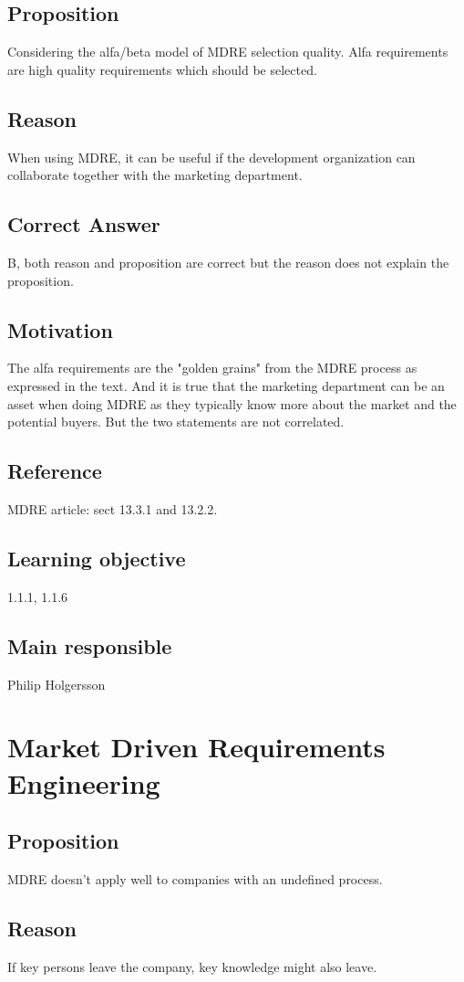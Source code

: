 \documentclass[a4paper]{article}
\begin{document}
\subsection*{Proposition}
Considering the alfa/beta model of MDRE selection quality. Alfa requirements are high quality requirements which should be selected.
\subsection*{Reason}
When using MDRE, it can be useful if the development organization can collaborate together with the marketing department.
\subsection*{Correct Answer}
B, both reason and proposition are correct but the reason does not explain the proposition.
\subsection*{Motivation}
The alfa requirements are the "golden grains" from the MDRE process as expressed in the text. And it is true that the marketing department can be an asset when doing MDRE as they typically know more about the market and the potential buyers. But the two statements are not correlated.
\subsection*{Reference}
MDRE article: sect 13.3.1 and 13.2.2.
\subsection*{Learning objective}
1.1.1, 1.1.6
\subsection*{Main responsible}
Philip Holgersson

\section{Market Driven Requirements Engineering}
\subsection*{Proposition}
MDRE doesn't apply well to companies with an undefined process.
\subsection*{Reason}
If key persons leave the company, key knowledge might also leave.
\end{document}
